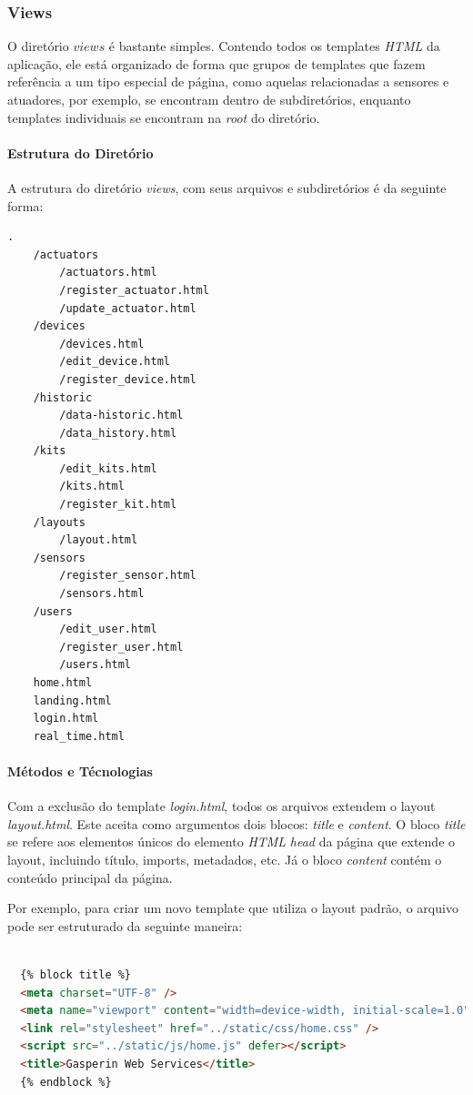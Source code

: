 \documentclass[conference, a4paper, 12pt]{IEEEtran}
\begin{document}
\subsubsection{Views}
O diretório $views$ é bastante simples. Contendo todos os templates \emph{HTML} da aplicação, ele está organizado de forma que grupos de templates que fazem referência a um tipo especial de página, como aquelas relacionadas a sensores e atuadores, por exemplo, se encontram dentro de subdiretórios, enquanto templates individuais se encontram na \emph{root} do diretório.

\paragraph{Estrutura do Diretório}
A estrutura do diretório \emph{views}, com seus arquivos e subdiretórios é da seguinte forma:

\begin{lstlisting}[caption=Estrutura do Diretório]
  .
    /actuators
        /actuators.html
        /register_actuator.html
        /update_actuator.html
    /devices
        /devices.html
        /edit_device.html
        /register_device.html
    /historic
        /data-historic.html
        /data_history.html
    /kits
        /edit_kits.html
        /kits.html
        /register_kit.html
    /layouts
        /layout.html
    /sensors
        /register_sensor.html
        /sensors.html
    /users
        /edit_user.html
        /register_user.html
        /users.html
    home.html
    landing.html
    login.html
    real_time.html
\end{lstlisting}

      \paragraph{Métodos e Técnologias}
      Com a exclusão do template \emph{login.html}, todos os arquivos extendem o layout \emph{layout.html}. Este aceita como argumentos dois blocos: \emph{title} e \emph{content}. O bloco \emph{title} se refere aos elementos únicos do elemento \emph{HTML} \emph{head} da página que extende o layout, incluindo título, imports, metadados, etc. Já o bloco \emph{content} contém o conteúdo principal da página.

      Por exemplo, para criar um novo template que utiliza o layout padrão, o arquivo pode ser estruturado da seguinte maneira:
      \begin{lstlisting}[language=html, caption=Snippet de home.html]

  {% block title %}
  <meta charset="UTF-8" />
  <meta name="viewport" content="width=device-width, initial-scale=1.0" />
  <link rel="stylesheet" href="../static/css/home.css" />
  <script src="../static/js/home.js" defer></script>
  <title>Gasperin Web Services</title>
  {% endblock %}

      \end{lstlisting}
\end{document}
